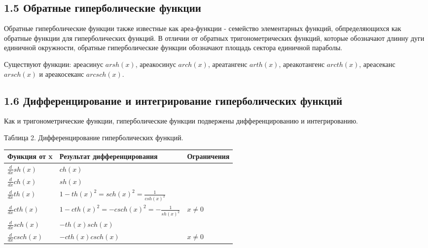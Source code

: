 \documentclass{article}
\begin{document}
\subsection*{1.5 Обратные гиперболические функции}

Обратные гиперболические функции также известные как ареа-функции - семейство элементарных функций, обпределяющихся как обратные функции для гиперболических функций. В отличии от обратных тригонометрических функций, которые обозначают длинну дуги единичной окружности, обратные гиперболические функции обозначают площадь сектора единичной параболы.

Существуют функции: ареасинус $arsh(x)$, ареакосинус $arch(x)$, ареатангенс $arth(x)$, ареакотангенс $arcth(x)$, ареасеканс $arsch(x)$ и ареакосеканс $arcsch(x)$.

\subsection*{1.6 Дифференцирование и интегрирование гиперболических функций}
Как и тригонометрические функции, гиперболические функции подвержены дифференцированию и интегрированию.

Таблица 2. Дифференцирование гиперболических функций.
\begin{center}
    \begin{tabular}{| p{3cm} | p{7cm} | p{3cm} |}
        \hline
        Функция от x & Результат дифференцирования & Ограничения\\ \hline
        $\frac{d}{dx}sh(x)$ & $ch(x)$ & \\ \hline
        $\frac{d}{dx}ch(x)$ & $sh(x)$ & \\ \hline
        $\frac{d}{dx}th(x)$ & $1-th(x)^2=sch(x)^2=\frac{1}{csh(x)^2}$ & \\ \hline
        $\frac{d}{dx}cth(x)$ & $1-cth(x)^2=-csch(x)^2=-\frac{1}{sh(x)^2}$ & $x\neq0$\\ \hline
        $\frac{d}{dx}sch(x)$ & $-th(x)sch(x)$ & \\ \hline
        $\frac{d}{dx}csch(x)$ & $-cth(x)csch(x)$ & $x\neq0$\\ \hline
    \end{tabular}
\end{center}
\end{document}
